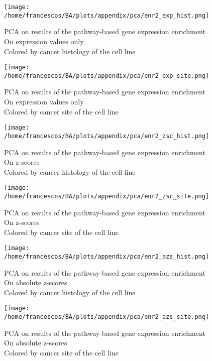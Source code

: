 \begin{figure}[H]
    \centering
    \texttt{[image: /home/francescos/BA/plots/appendix/pca/enr2\_exp\_hist.png]}
    \caption{PCA on results of the pathway-based gene expression enrichment\\On expression values only\\Colored by cancer histology of the cell line}
\end{figure}
\begin{figure}[H]
    \centering
    \texttt{[image: /home/francescos/BA/plots/appendix/pca/enr2\_exp\_site.png]}
    \caption{PCA on results of the pathway-based gene expression enrichment\\On expression values only\\Colored by cancer site of the cell line}
\end{figure}
\begin{figure}[H]
    \centering
    \texttt{[image: /home/francescos/BA/plots/appendix/pca/enr2\_zsc\_hist.png]}
    \caption{PCA on results of the pathway-based gene expression enrichment\\On z-scores\\Colored by cancer histology of the cell line}
\end{figure}
\begin{figure}[H]
    \centering
    \texttt{[image: /home/francescos/BA/plots/appendix/pca/enr2\_zsc\_site.png]}
    \caption{PCA on results of the pathway-based gene expression enrichment\\On z-scores\\Colored by cancer site of the cell line}
\end{figure}
\begin{figure}[H]
    \centering
    \texttt{[image: /home/francescos/BA/plots/appendix/pca/enr2\_azs\_hist.png]}
    \caption{PCA on results of the pathway-based gene expression enrichment\\On absolute z-scores\\Colored by cancer histology of the cell line}
\end{figure}
\begin{figure}[H]
    \centering
    \texttt{[image: /home/francescos/BA/plots/appendix/pca/enr2\_azs\_site.png]}
    \caption{PCA on results of the pathway-based gene expression enrichment\\On absolute z-scores\\Colored by cancer site of the cell line}
\end{figure}